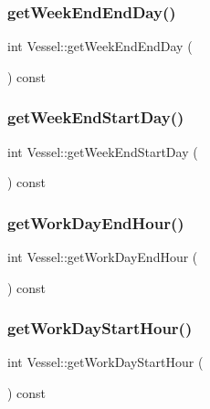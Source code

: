 \subsubsection{\texorpdfstring{getWeekEndEndDay()}{getWeekEndEndDay()}}
{\footnotesize\ttfamily int Vessel\+::get\+Week\+End\+End\+Day (\begin{DoxyParamCaption}{ }\end{DoxyParamCaption}) const\hspace{0.3cm}{\ttfamily [inline]}}

\mbox{\label{class_vessel_a4c188f3e683cc1271d431475e9427190}} 
\subsubsection{\texorpdfstring{getWeekEndStartDay()}{getWeekEndStartDay()}}
{\footnotesize\ttfamily int Vessel\+::get\+Week\+End\+Start\+Day (\begin{DoxyParamCaption}{ }\end{DoxyParamCaption}) const\hspace{0.3cm}{\ttfamily [inline]}}

\mbox{\label{class_vessel_a5b3be87f7630f2ad369b0ad69761f3ba}} 
\subsubsection{\texorpdfstring{getWorkDayEndHour()}{getWorkDayEndHour()}}
{\footnotesize\ttfamily int Vessel\+::get\+Work\+Day\+End\+Hour (\begin{DoxyParamCaption}{ }\end{DoxyParamCaption}) const\hspace{0.3cm}{\ttfamily [inline]}}

\mbox{\label{class_vessel_a5afa9db3f23e95a1b68ebba54769bf93}} 
\subsubsection{\texorpdfstring{getWorkDayStartHour()}{getWorkDayStartHour()}}
{\footnotesize\ttfamily int Vessel\+::get\+Work\+Day\+Start\+Hour (\begin{DoxyParamCaption}{ }\end{DoxyParamCaption}) const\hspace{0.3cm}{\ttfamily [inline]}}

